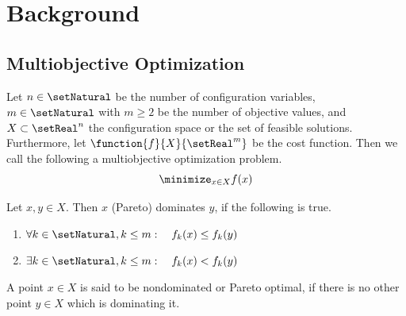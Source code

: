\documentclass{stdlocal}
\begin{document}
\section{Background} %
\label{sec:background}
  \subsection{Multiobjective Optimization} %
  \label{sub:multiobjective_optimization}
    \begin{definition*}
      Let $n\in\setNatural$ be the number of configuration variables, $m\in\setNatural$ with $m\geq 2$ be the number of objective values, and $X\subset\setReal^n$ the configuration space or the set of feasible solutions.
      Furthermore, let $\function{f}{X}{\setReal^m}$ be the cost function.
      Then we call the following a multiobjective optimization problem.
      \[
        \minimize_{x\in X} f(x)
      \]
    \end{definition*}
    \begin{definition*}[Domination]
      Let $x,y\in X$.
      Then $x$ (Pareto) dominates $y$, if the following is true.
      \begin{enumerate}
        \item $\forall k\in\setNatural, k\leq m:\quad f_k(x)\leq f_k(y)$
        \item $\exists k\in\setNatural, k\leq m:\quad f_k(x) < f_k(y)$
      \end{enumerate}
    \end{definition*}

    \begin{definition*}
      A point $x\in X$ is said to be nondominated or Pareto optimal, if there is no other point $y\in X$ which is dominating it.
    \end{definition*}
\end{document}
